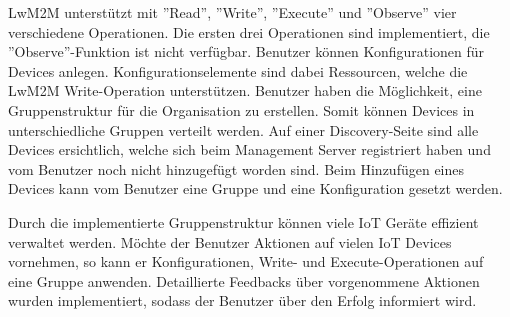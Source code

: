 LwM2M unterstützt mit ''Read'', ''Write'', ''Execute'' und ''Observe'' vier verschiedene Operationen. Die ersten drei Operationen sind implementiert, die ''Observe''-Funktion ist nicht verfügbar. Benutzer können Konfigurationen für Devices anlegen. Konfigurationselemente sind dabei Ressourcen, welche die LwM2M Write-Operation unterstützen. Benutzer haben die Möglichkeit, eine Gruppenstruktur für die Organisation zu erstellen. Somit können Devices in unterschiedliche Gruppen verteilt werden. Auf einer Discovery-Seite sind alle Devices ersichtlich, welche sich beim Management Server registriert haben und vom Benutzer noch nicht hinzugefügt worden sind. Beim Hinzufügen eines Devices kann vom Benutzer eine Gruppe und eine Konfiguration gesetzt werden.

Durch die implementierte Gruppenstruktur können viele IoT Geräte effizient verwaltet werden. Möchte der Benutzer Aktionen auf vielen IoT Devices vornehmen, so kann er Konfigurationen, Write- und Execute-Operationen auf eine Gruppe anwenden. Detaillierte Feedbacks über vorgenommene Aktionen wurden implementiert, sodass der Benutzer über den Erfolg informiert wird.